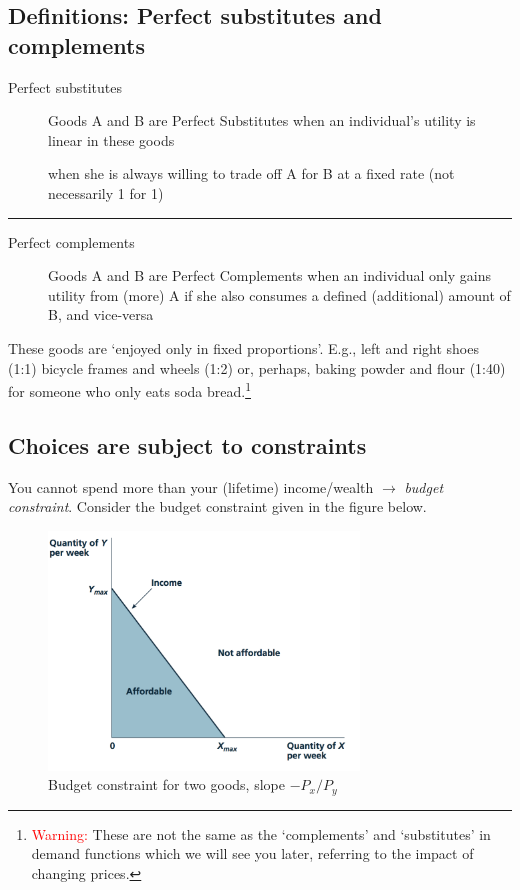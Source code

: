 \documentclass[]{article}
\begin{document}
\hypertarget{perfect-sub-comp}{%
\subsection{Definitions: Perfect substitutes and
complements}\label{perfect-sub-comp}}

\begin{description}
\item[Perfect substitutes]
Goods A and B are Perfect Substitutes when an individual's utility is
linear in these goods

when she is always willing to trade off A for B at a fixed rate (not
necessarily 1 for 1)
\end{description}

\begin{center}\rule{0.5\linewidth}{\linethickness}\end{center}

\begin{description}
\item[Perfect complements]
Goods A and B are Perfect Complements when an individual only gains
utility from (more) A if she also consumes a defined (additional) amount
of B, and vice-versa
\end{description}

\bigskip

These goods are `enjoyed only in fixed proportions'. E.g., left and
right shoes (1:1) bicycle frames and wheels (1:2) or, perhaps, baking
powder and flour (1:40) for someone who only eats soda bread.\footnote{\textcolor{red}{Warning:}
  These are not the same as the `complements' and `substitutes' in
  demand functions which we will see you later, referring to the impact
  of changing prices.}

\hypertarget{choices-are-subject-to-constraints}{%
\subsection{Choices are subject to
constraints}\label{choices-are-subject-to-constraints}}

You cannot spend more than your (lifetime) income/wealth \(\rightarrow\)
\emph{budget constraint}. Consider the budget constraint given in the
figure below.

\begin{figure}[h]
  \centering
    \includegraphics[height=2.5in]{picsfigs/budgetconstraint.png}
  \caption[Budget constraint for two goods]
   {Budget constraint for two goods, slope $-P_x/P_y$}
\end{figure}
\end{document}
